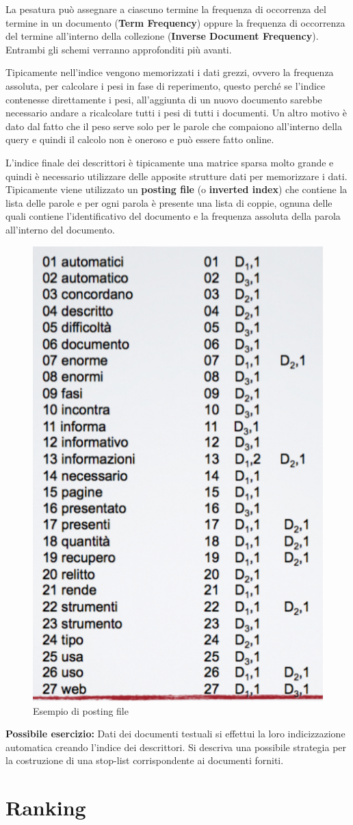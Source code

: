 La pesatura può assegnare a ciascuno termine la frequenza di occorrenza del termine in un documento (\textbf{Term Frequency}) oppure la frequenza di occorrenza del termine all'interno della collezione (\textbf{Inverse Document Frequency}). Entrambi gli schemi verranno approfonditi più avanti.

Tipicamente nell'indice vengono memorizzati i dati grezzi, ovvero la frequenza assoluta, per calcolare i pesi in fase di reperimento, questo perché se l'indice contenesse direttamente i pesi, all'aggiunta di un nuovo documento sarebbe necessario andare a ricalcolare tutti i pesi di tutti i documenti. Un altro motivo è dato dal fatto che il peso serve solo per le parole che compaiono all'interno della query e quindi il calcolo non è oneroso e può essere fatto online.

L'indice finale dei descrittori è tipicamente una matrice sparsa molto grande e quindi è necessario utilizzare delle apposite strutture dati per memorizzare i dati.
Tipicamente viene utilizzato un \textbf{posting file} (o \textbf{inverted index}) che contiene la lista delle parole e per ogni parola è presente una lista di coppie, ognuna delle quali contiene l'identificativo del documento e la frequenza assoluta della parola all'interno del documento.

\begin{figure}[htbp]
	\centering
	\includegraphics[width=0.3\linewidth]{images/l5-index-4}
	\caption{Esempio di posting file}
\end{figure}

\textbf{{\color{Red} Possibile esercizio:}} Dati dei documenti testuali si effettui la loro indicizzazione automatica creando l'indice dei descrittori. Si descriva una possibile strategia per la costruzione di una stop-list corrispondente ai documenti forniti.

\section{Ranking}

